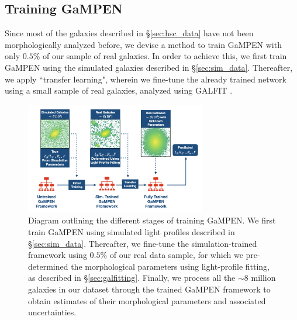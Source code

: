 \documentclass[linenumbers,twocolumn,twocolappendix]{aastex631}
\newcommand\gampen{GaMPEN}
\begin{document}
\begin{CJK*}{UTF8}{gbsn}
\section{Training \gampen{}} \label{sec:method}
 
Since most of the galaxies described in \S \ref{sec:hsc_data} have not been morphologically analyzed before, we devise a method to train \gampen{} with only $0.5\%$ of our sample of real galaxies. In order to achieve this, we first train \gampen{} using the simulated galaxies described in \S \ref{sec:sim_data}. Thereafter, we apply ``transfer learning", wherein we fine-tune the already trained network using a small sample of real galaxies, analyzed using GALFIT \citep{galfit}. 

\begin{figure}[htb]
    \centering
    \includegraphics[width
    =0.7\textwidth]{full_gampen_workflow.png}
    \caption{Diagram outlining the different stages of training \gampen{}. We first train \gampen{} using simulated light profiles described in \S \ref{sec:sim_data}. Thereafter, we fine-tune the simulation-trained framework using $0.5\%$ of our real data sample, for which we pre-determined the morphological parameters using light-profile fitting, as described in \S \ref{sec:galfitting}. Finally, we process all the $\sim 8$ million galaxies in our dataset through the trained \gampen{} framework to obtain estimates of their morphological parameters and associated uncertainties.}
    \label{fig:full_gampen_workflow}
\end{figure}


\end{CJK*}
\end{document}
